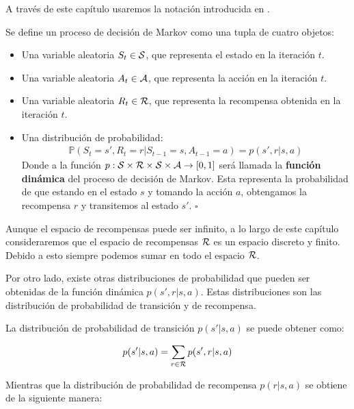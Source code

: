 A través de este capítulo usaremos la notación introducida en \cite[cap. 3]{sutton2018reinforcement}. 
 
\begin{defi}
Se define un proceso de decisión de Markov como una tupla de cuatro objetos:
\begin{itemize}
    \item Una variable aleatoria $S_t \in \mathcal{S}$, que representa el estado en la iteración $t$.
    \item Una variable aleatoria $A_t \in \mathcal{A}$, que representa la acción en la iteración $t$.
    \item Una variable aleatoria $R_t \in \mathcal{R}$, que representa la recompensa obtenida en la iteración $t$.
    \item Una distribución de probabilidad: 
    \begin{gather}\label{pdynamics}
        \mathbb{P}(S_{t}= s',R_{t} = r|S_{t-1} = s ,A_{t-1} = a) = p(s',r|s,a)
    \end{gather} 
    Donde a la función $p:\mathcal{S} \times \mathcal{R} \times \mathcal{S} \times \mathcal{A} \rightarrow [0,1]$ será llamada la \textbf{función dinámica} del proceso de decisión de Markov. Esta representa la probabilidad de que estando en el estado $s$ y tomando la acción $a$, obtengamos la recompensa $r$ y transitemos al estado $s'$. 
    \hfill\ensuremath{\square}
\end{itemize}
\end{defi}


\begin{obs}
   Aunque el espacio de recompensas puede ser infinito, a lo largo de este capítulo consideraremos que el espacio de recompensas $\mathcal{R}$ es un espacio discreto y finito. Debido a esto siempre podemos sumar en todo el espacio $\mathcal{R}$. 
\end{obs} 

Por otro lado, existe otras distribuciones de probabilidad que pueden ser obtenidas de la función dinámica $p(s',r|s,a)$. Estas distribuciones son las distribución de probabilidad de transición y de recompensa.

La distribución de probabilidad de transición $p(s'|s,a)$ se puede obtener como:

\begin{gather}\label{p(s'|s,a)}
    p(s'|s,a) =\sum_{r \in \mathcal{R}}  p(s',r|s,a)
\end{gather}

Mientras que  la distribución de probabilidad de recompensa $p(r|s,a)$ se obtiene de la siguiente manera:

